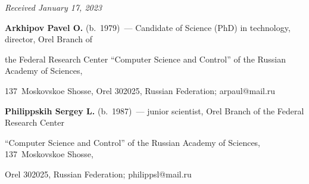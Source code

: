 \vspace*{-6pt}





\hfill{\small\textit{Received January 17, 2023}} 





\vspace*{-12pt} 








\Contr





\noindent


\textbf{Arkhipov Pavel O.} (b.\ 1979)~--- Candidate of Science (PhD) in technology, director, Orel Branch of 


the Federal Research Center ``Computer Science and Control'' of the Russian Academy of Sciences, 


137~Moskovskoe Shosse, Orel 302025, Russian Federation; arpaul@mail.ru





\vspace*{3pt}





\noindent


\textbf{Philippskih Sergey L.} (b.\ 1987)~--- junior scientist, Orel Branch of the Federal Research Center 


``Computer Science and Control'' of the Russian Academy of Sciences, 137~Moskovskoe Shosse, 


Orel 302025, Russian Federation; philippsl@mail.ru








\label{end\stat}





\renewcommand{\bibname}{\protect\rm Литература}    


